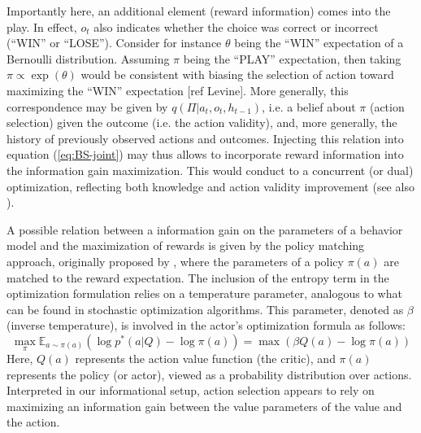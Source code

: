 \documentclass[10pt,letterpaper]{article}
\begin{document}
Importantly here,  an additional element (reward information) comes into the play. In effect,  $o_t$ also indicates whether the choice was correct or incorrect (``WIN'' or ``LOSE''). %
Consider for instance $\theta$ being the ``WIN'' expectation of a Bernoulli distribution. Assuming $\pi$ being the ``PLAY'' expectation, then taking $\pi \propto\exp(\theta)$ would be consistent with biasing the selection of action toward maximizing the ``WIN'' expectation [ref Levine]. More generally, %
this correspondence may be given by $q(\Pi|a_t, o_t, h_{t-1})$, i.e. a belief about $\pi$ (action selection) given the outcome (i.e. the action validity), and, more generally, the history of previously observed actions and outcomes. Injecting this relation into equation (\ref{eq:BS-joint}) may thus allows to incorporate reward information into the information gain maximization. This would conduct to a concurrent (or dual) optimization, reflecting both knowledge and action validity improvement (see also \cite{dauce2022concurrent}).

A possible relation between a information gain on the parameters of a behavior model and the maximization of rewards is given by the policy matching approach, originally proposed by \cite{haarnoja2018soft}, where the parameters of a policy $\pi(a)$ are matched to the reward expectation.
The inclusion of the entropy term in the optimization formulation relies on a temperature parameter, analogous to what can be found in stochastic optimization algorithms. This parameter, denoted as $\beta$ (inverse temperature), is involved in the actor's optimization formula as follows:
$$\max_\pi \mathbb{E}_{a\sim \pi(a)} \left(\log p^*(a|Q) - \log \pi(a)\right) = \max \left(\beta Q(a) - \log \pi(a)\right)$$
Here, $Q(a)$ represents the action value function (the critic), and $\pi(a)$ represents the policy (or actor), viewed as a probability distribution over actions. Interpreted in our informational setup, action selection appears to rely on maximizing an information gain between the value parameters of the value and the action.  
\end{document}
